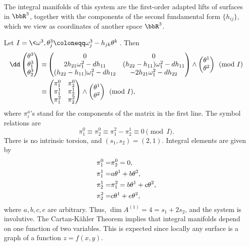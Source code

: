 \begin{example}
    The integral manifolds of this system are the first-order adapted lifts of surfaces in $\bbR^3$, together with the components of the second fundamental form $\{h_{ij}\}$, which we view as coordinates of another space $\bbR^3$.

    Let $I=\<\omega^3,\theta^3_j\coloneqq \omega^3_j-h_{jk}\theta^k\>$. Then 
    \begin{align}
        \dd \begin{pmatrix}
            \theta^3\\\theta^3_1\\\theta^3_2
        \end{pmatrix}
        \equiv& \begin{pmatrix}
            0 & 0\\
            2h_{21}\omega^2_1-dh_{11} & (h_{22}-h_{11})\omega^2_1-d h_{11}\\
            (h_{22}-h_{11})\omega^2_1-dh_{12} & -2h_{21}\omega^2_1-dh_{22}
        \end{pmatrix}\wedge 
        \begin{pmatrix}
            \theta^1\\
            \theta^2
        \end{pmatrix}\pmod{I} \notag \\
        \equiv& 
        \begin{pmatrix}
            \pi^0_1 & \pi^0_2\\
            \pi^1_1 & \pi^1_2\\
            \pi^2_1 & \pi^2_2
        \end{pmatrix}\wedge 
        \begin{pmatrix}
            \theta^1\\
            \theta^2
        \end{pmatrix}\pmod{I},
    \end{align}
    where $\pi^a_i$'s stand for the components of the matrix in the first line. The symbol relations are 
    \[\pi^0_1\equiv \pi^0_2\equiv \pi^2_1-\pi^1_2\equiv 0\pmod{I}.\]
    There is no intrinsic torsion, and $(s_1,s_2)=(2,1)$. Integral elements are given by 
    \begin{align}
        \pi^0_1=&\pi^0_2=0,\notag\\
        \pi^1_1=&a\theta^1+b\theta^2,\notag\\
        \pi^1_2=&\pi^2_1=b\theta^1+c\theta^2,\notag\\
        \pi^2_2=&c\theta^1+e\theta^2,
    \end{align}
    where $a,b,c,e$ are arbitrary. Thus, $\dim A^{(1)}=4=s_1+2s_2$, and the system is involutive. The Cartan-K\"ahler Theorem implies that integral manifolds depend on one function of two variables. This is expected since locally any surface is a graph of a function $z=f(x,y)$.
\end{example}

